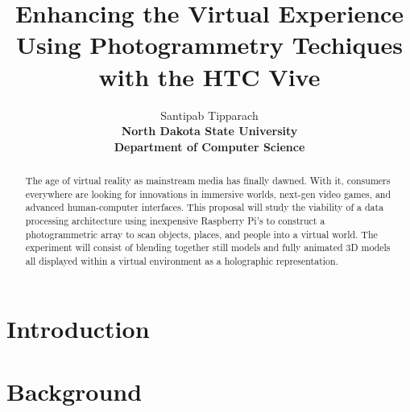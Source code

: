 \documentclass[10pt,a4paper]{article}
\title{\textbf{\Huge Enhancing the Virtual Experience Using Photogrammetry Techiques\\
		\Large with the HTC Vive }}
\author{Santipab Tipparach\\
	\textbf{North Dakota State University}\\\textbf{Department of Computer Science}}
\begin{document}
	\maketitle

	\begin{abstract}
	The age of virtual reality as mainstream media has finally dawned. With it, consumers everywhere are looking for innovations in immersive worlds, next-gen video games, and advanced human-computer interfaces. This proposal will study the viability of a data processing architecture using inexpensive Raspberry Pi's to construct a photogrammetric array to scan objects, places, and people into a virtual world. The experiment will consist of blending together still models and fully animated 3D models all displayed within a virtual environment as a holographic representation.

	\end{abstract}

	\section{Introduction}


	\section{Background}
\end{document}
